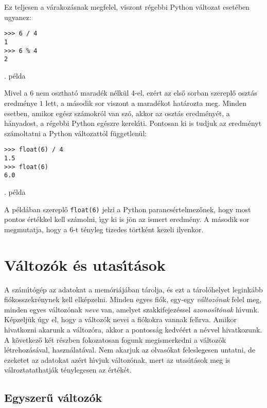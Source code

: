 \documentclass[12pt]{article}
\newcounter{minta}[section]
\newcommand{\incminta}{\stepcounter{minta}}
\begin{document}
\noindent Ez teljesen a v\'arakoz\'asnak megfelel, viszont r\'egebbi Python v\'altozat eset\'eben ugyanez:

\incminta
\begin{Verbatim}[fontsize=\small]
>>> 6 / 4
1
>>> 6 % 4
2
\end{Verbatim}
\theminta. p\'elda

\noindent Mivel a 6 nem oszthat\'o marad\'ek n\'elk\"ul 4-el, ez\'ert az els\H{o} sorban szerepl\H{o} oszt\'as 
eredm\'enye $1$ lett, a m\'asodik sor viszont a marad\'ekot hat\'arozta meg. Minden esetben, amikor eg\'esz 
sz\'amokr\'ol van sz\'o, akkor az oszt\'as eredm\'eny\'et, a h\'anyadost, a r\'egebbi Python eg\'eszre 
kerek\'{\i}ti.  Pontosan ki is tudjuk az eredm\'enyt sz\'amoltatni a Python v\'altozatt\'ol f\"uggetlen\"ul:

\incminta
\begin{Verbatim}[fontsize=\small]
>>> float(6) / 4
1.5
>>> float(6)
6.0
\end{Verbatim}
\theminta. p\'elda

\noindent A p\'eld\'aban szerepl\H{o} {\tt float(6)} jelzi a Python parancs\'ertelmez\H{o}nek, hogy most pontos 
\'ert\'ekkel kell sz\'amolni, \'{\i}gy ki is j\"on az ismert eredm\'eny. A m\'asodik sor megmutatja, hogy a 6-t 
t\'enyleg tizedes t\"ortk\'ent kezeli ilyenkor.

\section{V\'altoz\'ok \'es utas\'{\i}t\'asok}

A sz\'am\'{\i}t\'og\'ep az adatokat a mem\'ori\'aj\'aban t\'arolja, \'es ezt a t\'arol\'ohelyet legink\'abb 
fi\'okosszekr\'enynek kell elk\'epzelni. Minden egyes fi\'ok, egy-egy {\sl v\'altoz\'onak}  felel 
meg, minden egyes 
v\'altoz\'onak {\it neve} van, amelyet szakkifejez\'essel {\sl azonos\'{\i}t\'onak}  h\'{\i}vunk. 
K\'epzelj\"uk \'ugy el, hogy a v\'altoz\'ok nevei a fi\'okokra vannak fel\'{\i}rva. Amikor hivatkozni akarunk a 
v\'altoz\'ora, akkor a pontoss\'ag kedv\'e\'ert a n\'evvel hivatkozunk. A k\"ovetkez\H{o} k\'et r\'eszben fokozatosan 
fogunk megismerkedni a v\'altoz\'ok l\'etrehoz\'as\'aval, haszn\'alat\'aval. Nem akarjuk az olvas\'okat feleslegesen 
untatni, de ezeketet az adatokat az\'ert h\'{\i}vjuk v\'altoz\'onak, mert az utas\'{\i}t\'asok meg is v\'alroztatathatj\'ak 
t\'enylegesen az \'ert\'ek\'et.

\subsection{Egyszer\H{u} v\'altoz\'ok}
\end{document}
